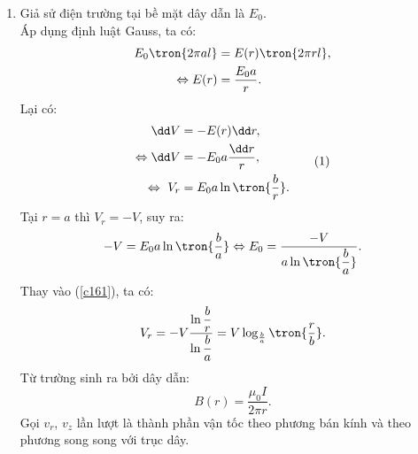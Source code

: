 \begin{loigiai}
\begin{enumerate}[1)]
\begin{center}

        \end{center}
        \item Giả sử điện trường tại bề mặt dây dẫn là $E_0$.\\
        Áp dụng định luật Gauss, ta có:
        \begin{equation*}
        \begin{aligned}
             E_0\tron{2\pi al}&=E(r)\tron{2\pi rl},\\
             \Leftrightarrow E(r)&=\dfrac{E_0a}{r}.
        \end{aligned}
        \end{equation*}
        Lại có:
        \[\begin{aligned}
            \dd V&=-E(r)\dd r,\\
            \Leftrightarrow  \dd V&=-E_0a\frac{\dd r}{r},\\
            \Leftrightarrow \ V_r&=E_0a\ln\tron{\dfrac{b}{r}}.
        \end{aligned}\tag{1}\label{c161}\]
        Tại $r=a$ thì $V_r=-V$, suy ra:
        $$ -V=E_0a\ln\tron{\dfrac{b}{a}}\Leftrightarrow E_0=\dfrac{-V}{a\ln\tron{\dfrac{b}{a}}}.$$
        Thay vào (\ref{c161}), ta có:
        $$V_r=-V\dfrac{\ln\dfrac{b}{r}}{\ln\dfrac{b}{a}}=V\log_{\frac{b}{a}}\tron{\dfrac{r}{b}}.$$
        Từ trường sinh ra bởi dây dẫn:
        $$B(r)=\dfrac{\mu_0I}{2\pi r}.$$
        Gọi $v_r$, $v_z$ lần lượt là thành phần vận tốc theo phương bán kính và theo phương song song với trục dây.\\
        \begin{minipage}{0.5\textwidth}
             
\centering
{} %

\begin{tikzpicture}[x=0.75pt,y=0.75pt,yscale=-1,xscale=1]


\end{tikzpicture}
\end{minipage}
\end{enumerate}
\end{loigiai}
